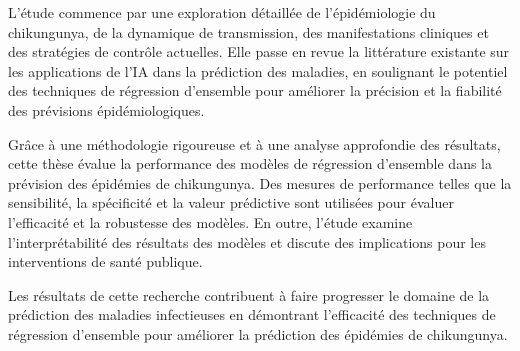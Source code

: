 L'étude commence par une exploration détaillée de l'épidémiologie du chikungunya, de la dynamique de transmission, des manifestations cliniques et des stratégies de contrôle actuelles. Elle passe en revue la littérature existante sur les applications de l'IA dans la prédiction des maladies, en soulignant le potentiel des techniques de régression d'ensemble pour améliorer la précision et la fiabilité des prévisions épidémiologiques.

Grâce à une méthodologie rigoureuse et à une analyse approfondie des résultats, cette thèse évalue la performance des modèles de régression d'ensemble dans la prévision des épidémies de chikungunya. Des mesures de performance telles que la sensibilité, la spécificité et la valeur prédictive sont utilisées pour évaluer l'efficacité et la robustesse des modèles. En outre, l'étude examine l'interprétabilité des résultats des modèles et discute des implications pour les interventions de santé publique.

Les résultats de cette recherche contribuent à faire progresser le domaine de la prédiction des maladies infectieuses en démontrant l'efficacité des techniques de régression d'ensemble pour améliorer la prédiction des épidémies de chikungunya.

